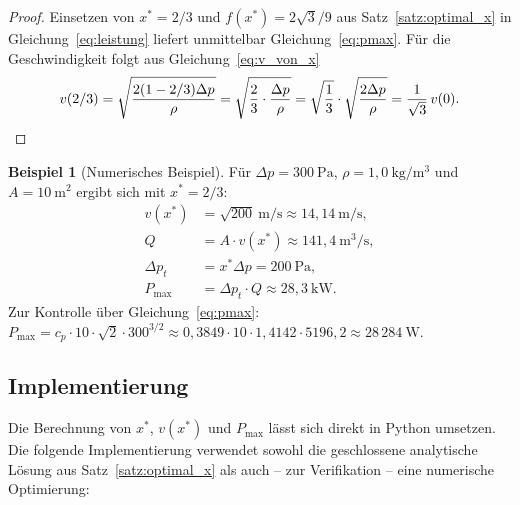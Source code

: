 ﻿\documentclass[a4paper,12pt]{article}
\theoremstyle{definition}
\newtheorem{beispiel}{Beispiel}
\begin{document}
\begin{proof}
	Einsetzen von $x^\ast = 2/3$ und $f(x^\ast) = 2\sqrt{3}/9$ aus
	Satz~\ref{satz:optimal_x} in Gleichung~\eqref{eq:leistung} liefert
	unmittelbar Gleichung~\eqref{eq:pmax}. Für die Geschwindigkeit folgt
	aus Gleichung~\eqref{eq:v_von_x}
	\[
		v(2/3) = \sqrt{\frac{2(1-2/3)\Delta p}{\rho}}
		= \sqrt{\frac{2}{3}\cdot\frac{\Delta p}{\rho}}
		= \sqrt{\frac{1}{3}} \cdot \sqrt{\frac{2\Delta p}{\rho}}
		= \frac{1}{\sqrt{3}}\, v(0). \qedhere
	\]
\end{proof}

\begin{beispiel}[Numerisches Beispiel]
	\label{bsp:numerisch}
	Für $\Delta p = 300\ \mathrm{Pa}$, $\rho = 1{,}0\ \mathrm{kg/m^3}$ und
	$A = 10\ \mathrm{m^2}$ ergibt sich mit $x^\ast = 2/3$:
	\begin{align*}
		v(x^\ast) &= \sqrt{200}\ \mathrm{m/s} \approx 14{,}14\ \mathrm{m/s}, \\
		Q &= A \cdot v(x^\ast) \approx 141{,}4\ \mathrm{m^3/s}, \\
		\Delta p_t &= x^\ast \Delta p = 200\ \mathrm{Pa}, \\
		P_{\max} &= \Delta p_t \cdot Q \approx 28{,}3\ \mathrm{kW}.
	\end{align*}
	Zur Kontrolle über Gleichung~\eqref{eq:pmax}:
	$P_{\max} = c_p \cdot 10 \cdot \sqrt{2} \cdot 300^{3/2}
	\approx 0{,}3849 \cdot 10 \cdot 1{,}4142 \cdot 5196{,}2
	\approx 28\,284\ \mathrm{W}$. \checkmark
\end{beispiel}

\subsection{Implementierung}

Die Berechnung von $x^\ast$, $v(x^\ast)$ und $P_{\max}$ lässt sich direkt
in Python umsetzen. Die folgende Implementierung verwendet sowohl die
geschlossene analytische Lösung aus Satz~\ref{satz:optimal_x} als auch
-- zur Verifikation -- eine numerische Optimierung:
\end{document}
